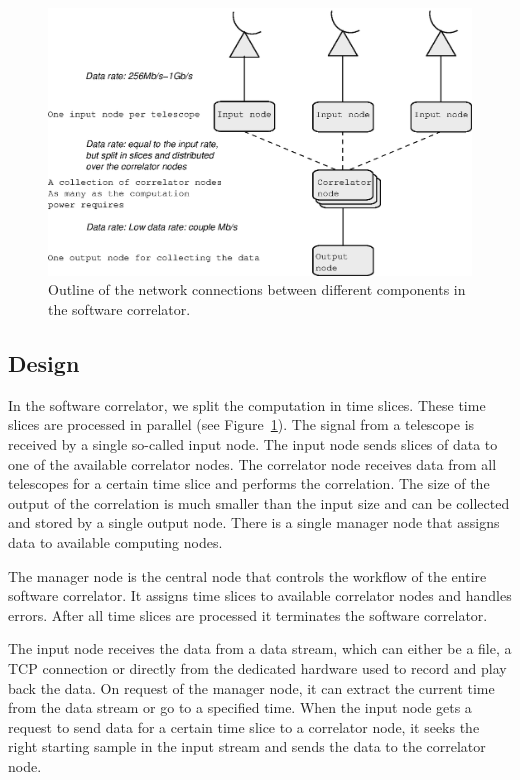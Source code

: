 \begin{figure}
  \centering
  \includegraphics[width=.75\textwidth]
    {img/Network_correlator}
    \caption{Outline of the network connections between different
      components in the software correlator.}
  \label{fig:netw_corr}
\end{figure}


\subsection{Design}
In the software correlator, we split the computation in time slices.
These time slices are processed in parallel (see
Figure~\ref{fig:netw_corr}). The signal from a telescope is received
by a single so-called input node.  The input node sends slices of data
to one of the available correlator nodes. The correlator node receives
data from all telescopes for a certain time slice and performs the
correlation. The size of the output of the correlation is much smaller
than the input size and can be collected and stored by a single output
node.  There is a single manager node that assigns data to available
computing nodes.

The manager node is the central node that controls the workflow of the
entire software correlator. It assigns time slices to available
correlator nodes and handles errors. After all time slices are
processed it terminates the software correlator.

The input node receives the data from a data stream, which can either
be a file, a TCP connection or directly from the dedicated hardware
used to record and play back the data. On request of the manager node,
it can extract the current time from the data stream or go to a
specified time. When the input node gets a request to send data for a
certain time slice to a correlator node, it seeks the right starting
sample in the input stream and sends the data to the correlator node.


